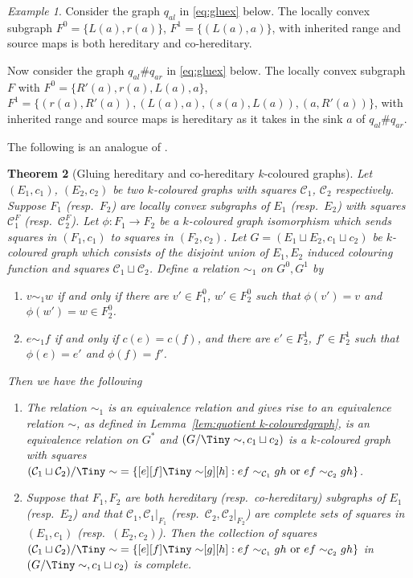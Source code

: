 \documentclass[12pt]{amsart}
\newtheorem{thm}{Theorem}[section]
\theoremstyle{definition}
\theoremstyle{remark}
\newtheorem{example}[thm]{Example}
\numberwithin{equation}{section}
\newcommand{\Cc}{\mathcal{C}}
\begin{document}
\begin{example}
Consider the graph $q_{al}$ in \eqref{eq:gluex} below. The locally convex subgraph $F^0 = \{ L(a) , r(a) \}$, $F^1 = \{ ( L(a),a) \}$, with inherited range and source maps is both hereditary and co-hereditary.

Now consider the graph $q_{al} \# q_{ar}$ in \eqref{eq:gluex} below. The locally convex subgraph $F$ with $F^0 = \{ R'(a), r(a), L(a),a \}$, $F^1 = \{ (r(a),R'(a)), (L(a),a), (s(a),L(a)) , (a,R'(a)) \}$, with inherited range and source maps is hereditary as it takes in the sink $a$ of $q_{al} \# q_{ar}$.
\end{example}

\noindent
The following is an analogue of \cite[Example 2.2]{KPSW}.

\begin{thm}[Gluing hereditary and co-hereditary $k$-coloured graphs] \label{thm:glue}
Let $(E_1,c_1)$, $(E_2,c_2)$ be two $k$-coloured graphs with squares $\Cc_1$, $\Cc_2$ respectively. Suppose $F_1$ (resp.\ $F_2$) are  locally convex subgraphs of $E_1$ (resp.\ $E_2$) with squares $\Cc^F_1$ (resp.\ $\Cc^F_2$). Let $\phi : F_1 \to F_2$ be a $k$-coloured graph isomorphism which sends squares in $(F_1,c_1)$ to squares in $(F_2,c_2)$. Let $G = ( E_1 \sqcup E_2 , c_1\sqcup c_2)$ be $k$-coloured graph which consists of the disjoint union of $E_1 , E_2$ induced colouring function and squares $\Cc_1 \sqcup \Cc_2$. Define a  relation $\sim_1$ on $G^0 , G^1$ by 
\begin{enumerate}
\item $v \sim_1 w$ if and only if there are $v' \in F_1^0$, $w' \in F_{2}^0$ such that $\phi (v') = v$ and  $\phi ( w' ) = w \in F_2^0$.
\item $e \sim_1 f$ if and only if $c(e)=c(f)$, and there are $e' \in F_2^1$, $f' \in F_{2}^1$ such that $\phi (e) = e'$ and $\phi ( f) =f'$.
\end{enumerate}
Then we have the following
\begin{enumerate}[label={(\roman*)}]
\item The relation $\sim_1$ is an equivalence relation and gives rise to an equivalence relation $\sim$, as defined in  Lemma~\ref{lem:quotient k-colouredgraph}, is an equivalence relation on $G^*$ and $( G/{\Tiny\sim} , c_1 \sqcup c_2 )$ is a $k$-coloured graph with squares $(\Cc_1 \sqcup \Cc_2) / {\Tiny\sim}= \{ [e][f] {\Tiny\sim} [g][h] : ef \sim_{\Cc_1} gh \text{ or } ef \sim_{\Cc_2} gh \}$.

 \item Suppose that $F_1, F_2$ are both hereditary (resp.\ co-hereditary) subgraphs of $E_1$ (resp.\ $E_2$) and that $\Cc_1 , \Cc_1 |_{F_1}$ (resp.\ $\Cc_2 , \Cc_2 |_{F_2}$) are complete sets of squares in $(E_1,c_1)$ (resp.\ $(E_2,c_2)$). Then the collection of squares $(\Cc_1 \sqcup \Cc_2) / {\Tiny\sim}= \{ [e][f] {\Tiny\sim} [g][h] : ef \sim_{\Cc_1} gh \text{ or } ef \sim_{\Cc_2} gh \}$ in $( G/{\Tiny\sim} , c_1 \sqcup c_2 )$ is complete.
\end{enumerate}
\end{thm}
\end{document}
